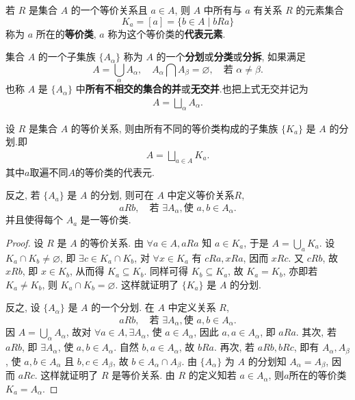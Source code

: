 \documentclass[../../main.tex]{subfiles}%
\begin{document}
\begin{definition}[等价类和代表元素]
若 \( R \) 是集合 \( A \) 的一个等价关系且 \( a \in A \), 则 \( A \) 中所有与 \( a \) 有关系 \( R \) 的元素集合
\[
K_a =[a]= \{ b \in A \mid bRa \}
\]
称为 \( a \) 所在的\textbf{等价类}, \( a \) 称为这个等价类的\textbf{代表元素}.
\end{definition}

\begin{definition}[分划/分类]
集合 \( A \) 的一个子集族 \( \{ A_\alpha \} \) 称为 \( A \) 的一个\textbf{分划}或\textbf{分类}或\textbf{分拆}, 如果满足
\[
A = \bigcup_\alpha A_\alpha,\quad A_\alpha \bigcap A_\beta = \varnothing,\quad \text{若 } \alpha \neq \beta.
\]
也称 \( A \) 是 \( \{ A_\alpha \} \) 中\textbf{所有不相交的集合的并}或\textbf{无交并}.也把上式无交并记为
\begin{align*}
A = \bigsqcup_{\alpha}A_\alpha .
\end{align*}
\end{definition}

\begin{theorem}\label{theorem:等价类就和集合的分划对应-定理1.1.1}
设 \( R \) 是集合 \( A \) 的等价关系, 则由所有不同的等价类构成的子集族 \( \{ K_a \} \) 是 \( A \) 的分划.即
\begin{align*}
A=\bigsqcup_{a\in A}K_a.
\end{align*}
其中$a$取遍不同$A$的等价类的代表元.

反之, 若 \( \{ A_a \} \) 是 \( A \) 的分划, 则可在 \( A \) 中定义等价关系$R$,
\[
aRb, \quad \text{若 } \exists A_\alpha, \text{使 } a,b \in A_\alpha.
\]
并且使得每个 \( A_a \) 是一等价类.
\end{theorem}
\begin{proof}
设 \( R \) 是 \( A \) 的等价关系. 由 \( \forall a \in A, aRa \) 知 \( a \in K_a \), 于是 \( A = \bigcup_a K_a \). 设 \( K_a \cap K_b \neq \varnothing \), 即 \( \exists c \in K_a \cap K_b \), 对 \( \forall x \in K_a \) 有 \( cRa, xRa \), 因而 \( xRc \). 又 \( cRb \), 故 \( xRb \), 即 \( x \in K_b \), 从而得 \( K_a \subseteq K_b \). 同样可得 \( K_b \subseteq K_a \), 故 \( K_a = K_b \), 亦即若 \( K_a \neq K_b \), 则 \( K_a \cap K_b = \varnothing \). 这样就证明了 \( \{ K_a \} \) 是 \( A \) 的分划.

反之, 设 \( \{ A_\alpha \} \) 是 \( A \) 的一个分划. 在 \( A \) 中定义关系 \( R \),
\[
aRb, \quad \text{若 } \exists A_\alpha, \text{使 } a,b \in A_\alpha.
\]
因 \( A = \bigcup_\alpha A_\alpha \), 故对 \( \forall a \in A, \exists A_\alpha \), 使 \( a \in A_\alpha \), 因此 \( a,a \in A_\alpha \), 即 \( aRa \). 其次, 若 \( aRb \), 即 \( \exists A_\alpha \), 使 \( a,b \in A_\alpha \). 自然 \( b,a \in A_\alpha \), 故 \( bRa \). 再次, 若 \( aRb, bRc \), 即有 \( A_\alpha, A_\beta \), 使 \( a,b \in A_\alpha \) 且 \( b,c \in A_\beta \), 故 \( b \in A_\alpha \cap A_\beta \). 由 \( \{ A_\alpha \} \) 为 \( A \) 的分划知 \( A_\alpha = A_\beta \), 因而 \( aRc \). 这样就证明了 \( R \) 是等价关系. 由 \( R \) 的定义知若 \( a \in A_\alpha \), 则$a$所在的等价类\( K_a = A_\alpha \).
\end{proof}
\end{document}
